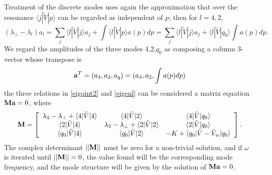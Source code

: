 \documentclass[12pt]{article}
\def\ket#1{|#1\rangle}
\def\bra#1{\langle#1}
\def\a{{\bf a}}
\def\M{{\bf M}}
\begin{document}
Treatment of the discrete modes uses again the approximation that
over the resonance $\bra{j}|\tilde V\ket{p}$ can be regarded as
independent of $p$; then for $l=4,2$,
\begin{equation}
  \label{eigenl}
  (\lambda_\perp-\lambda_l)a_l=\sum_j\bra{l}|\tilde{V}\ket{j}a_j
  +\int\bra{l}|\tilde{V}\ket{p}a(p)dp
  =\sum_j\bra{l}|\tilde{V}\ket{j}a_j
  +\bra{l}|\tilde{V}\ket{q_0}\int a(p)dp.
\end{equation}
We regard the amplitudes of the three modes 4,2,$q_0$ as composing a
column 3-vector whose transpose is
\begin{equation}
  \label{avector}
  \a^T=(a_4,a_2,a_q)=(a_4,a_2,\int a(p)dp)
\end{equation}
the three relations in \ref{eigqint2} and \ref{eigenl} can be
considered a matrix equation $\M\a=0$, where
\begin{equation}
  \label{aveq}
  \M=\left[
  \begin{array}{ccc}
    \lambda_4-\lambda_\perp+\bra{4}|\tilde V\ket{4}
    &\bra{4}|\tilde V\ket{2}&\bra{4}|\tilde V\ket{q_0}\\
    \bra{2}|\tilde V\ket{4}
    &\lambda_2-\lambda_\perp+\bra{2}|\tilde
      V\ket{2}&\bra{2}|\tilde V\ket{q_0}\\
    \bra{q_0}|\tilde V\ket{4}
    &\bra{q_0}|\tilde V\ket{2}&-K+\bra{q_0}|\tilde V-\tilde V_w\ket{q_0}
  \end{array}\right]
\iffalse
\left[
  \begin{array}{c}
    a_4\\
    a_2\\
    \int a(p)dp
  \end{array}\right]=0.
\fi.
\end{equation}
The complex determinant $||\M||$ must be zero for a non-trivial
solution, and if $\omega$ is iterated until $||\M||=0$, the value
found will be the corresponding mode frequency, and the mode structure
will be given by the solution of $\M\a=0$.

\iffalse
Note\footnote{
The ordered perturbative approximations found in prior sections correspond,
in this formulation, to neglecting $\bra{2}|\tilde V\ket{q_0}$,
$\bra{q_0}|\tilde V\ket{2}$ and $\bra{2}|\tilde V\ket{2}$; then
determining $a_2/a_4$ from the second row, and $\int a(p)dp/a_4$ from the third
row.}\fi
\end{document}
